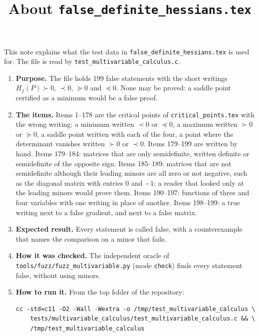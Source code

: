 \documentclass[11pt,a4paper]{article}
\title{About \texttt{false\_definite\_hessians.tex}}
\author{}
\date{}
\begin{document}
\maketitle
This note explains what the test data in \texttt{false\_definite\_hessians.tex} is used for. The file is read by \texttt{test\_multivariable\_calculus.c}.

\begin{enumerate}
\item \textbf{Purpose.} The file holds 199 false statements with the short writings $H_{f}(P) \succ 0$, $\prec 0$, $\succeq 0$ and $\preceq 0$. None may be proved: a saddle point certified as a minimum would be a false proof.

\item \textbf{The items.} Items 1--178 are the critical points of \texttt{critical\_points.tex} with the wrong writing: a minimum written $\prec 0$ or $\preceq 0$, a maximum written $\succ 0$ or $\succeq 0$, a saddle point written with each of the four, a point where the determinant vanishes written $\succ 0$ or $\prec 0$. Items 179--199 are written by hand. Items 179--184: matrices that are only semidefinite, written definite or semidefinite of the opposite sign. Items 185--189: matrices that are not semidefinite although their leading minors are all zero or not negative, such as the diagonal matrix with entries $0$ and $-1$: a reader that looked only at the leading minors would prove them. Items 190--197: functions of three and four variables with one writing in place of another. Items 198--199: a true writing next to a false gradient, and next to a false matrix.

\item \textbf{Expected result.} Every statement is called false, with a counterexample that names the comparison on a minor that fails.

\item \textbf{How it was checked.} The independent oracle of \texttt{tools/fuzz/fuzz\_multivariable.py} (mode \texttt{check}) finds every statement false, without using minors.

\item \textbf{How to run it.} From the top folder of the repository:
\begin{verbatim}
cc -std=c11 -O2 -Wall -Wextra -o /tmp/test_multivariable_calculus \
    tests/multivariable_calculus/test_multivariable_calculus.c && \
    /tmp/test_multivariable_calculus
\end{verbatim}
\end{enumerate}
\end{document}
